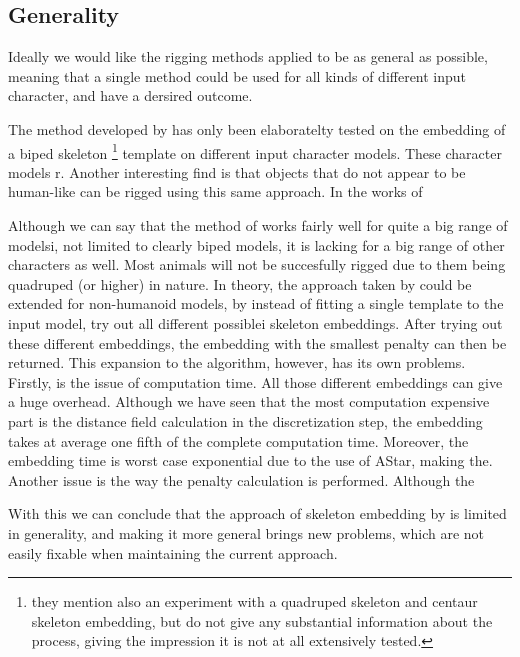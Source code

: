 \documentclass{article}
\begin{document}
\subsection{Generality}
Ideally we would like the rigging methods applied to be as general as possible,
meaning that a single method could be used for all kinds of different input
character, and have a dersired outcome.

The method developed by \citep{paper1} has only been elaboratelty tested on the
 embedding of a biped skeleton \footnote{they mention also an experiment with a quadruped
skeleton and centaur skeleton embedding, but do not give any substantial information
about the process, giving the impression it is not at all extensively tested.}
template on different input character models. These
character models r.
Another interesting find is that objects that do not appear to be human-like can
be rigged using this same approach. In the works of 

Although we can say that the method of \citep{paper1} works fairly well for
quite a big range of modelsi, not limited to clearly biped models, it is lacking for a big range of other characters
as well. Most animals will not be succesfully rigged due to them being quadruped
(or higher)
in nature. In theory, the approach taken by \citep{paper1} could be extended for
non-humanoid models, by instead of fitting a single template to the input model,
try out all different possiblei skeleton
embeddings. After trying out these different embeddings, the embedding with the
smallest penalty can then be returned. This expansion to the algorithm, however,
has its own problems. Firstly, is the issue of computation time. All those different embeddings can give a 
huge overhead. Although we have seen that the most computation expensive part is
the distance field calculation in the discretization step, the embedding takes
at average one fifth of the complete computation time. Moreover, the
embedding time is worst case exponential due to the use of AStar, making the.
Another issue is the way the penalty calculation is performed. Although the 

With this we can conclude that the approach of skeleton embedding by
\citep{paper1} is limited in generality, and making it more general brings new
problems, which are not easily fixable when maintaining the current approach.

\end{document}
